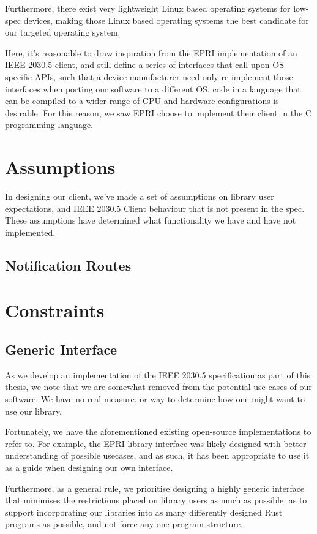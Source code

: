 Furthermore, there exist very lightweight Linux based operating systems for low-spec devices, making those Linux based operating systems the best candidate for our targeted operating system.

Here, it's reasonable to draw inspiration from the EPRI implementation of an IEEE 2030.5 client, and still define a series of interfaces that call upon OS specific APIs, such that a device manufacturer need only re-implement those interfaces when porting our software to a different OS.
code in a language that can be compiled to a wider range of CPU and hardware configurations is desirable. 
    For this reason, we saw EPRI choose to implement their client in the C programming language.
    
\section{Assumptions}
In designing our client, we've made a set of assumptions on library user expectations, and IEEE 2030.5 Client behaviour that is not present in the spec. These assumptions  have determined what functionality we have and have not implemented.

\subsection{Notification Routes}

\section{Constraints}

\subsection{Generic Interface}
As we develop an implementation of the IEEE 2030.5 specification as part of this thesis, we note that we are somewhat removed from the potential use cases of our software. We have no real measure, or way to determine how one might want to use our library. 

Fortunately, we have the aforementioned existing open-source implementations to refer to. For example, the EPRI library interface was likely designed with better understanding of possible usecases, and as such, it has been appropriate to use it as a guide when designing our own interface.

Furthermore, as a general rule, we prioritise designing a highly generic interface that minimises the restrictions placed on library users as much as possible, as to support incorporating our libraries into as many differently designed Rust programs as possible, and not force any one program structure.

